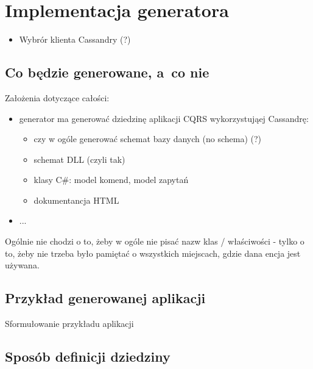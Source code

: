 \chapter{Implementacja generatora} \label{chap:implementation:single_type}

\begin{itemize}
 \item Wybrór klienta Cassandry (?)  
\end{itemize}



\section{Co będzie generowane, a~co nie}

Założenia dotyczące całości:

\begin{itemize}
 \item generator ma generować dziedzinę aplikacji CQRS wykorzystująej Cassandrę:
  \begin{itemize}
   \item czy w ogóle generować schemat bazy danych (no schema) (?)
   \item schemat DLL (czyli tak)
   \item klasy C\#: model komend, model zapytań
   \item dokumentancja HTML
  \end{itemize}
 \item ...
\end{itemize}

Ogólnie nie chodzi o to, żeby w ogóle nie pisać nazw klas / właściwości - tylko o to, żeby nie trzeba było pamiętać o wszystkich miejscach, gdzie dana encja jest używana.



\section{Przykład generowanej aplikacji}

Sformułowanie przykładu aplikacji



\section{Sposób definicji dziedziny}

